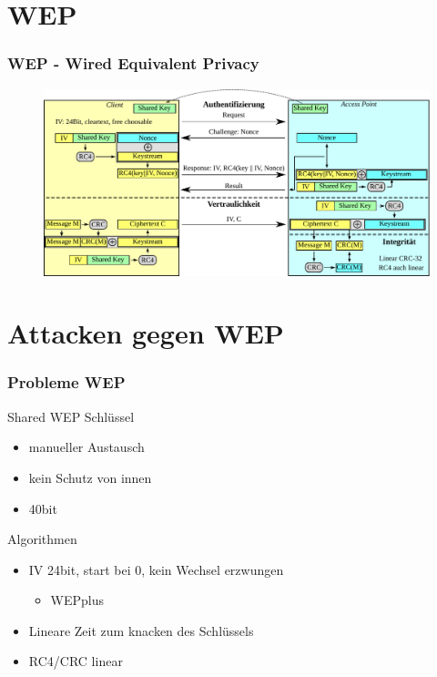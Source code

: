 \documentclass{beamer}
\begin{document}
\section{WEP}
\begin{frame}
\frametitle{WEP - Wired Equivalent Privacy}
\begin{figure}
	\includegraphics[width=1.0\linewidth]{figures/WEP_complete.pdf}
\end{figure}
\end{frame}


\section{Attacken gegen WEP}
\begin{frame}
\frametitle{Probleme WEP}
\begin{block}{Shared WEP Schlüssel}
\begin{itemize}
	\item manueller Austausch
	\item kein Schutz von innen
	\item 40bit
\end{itemize}
\end{block}
\begin{block}{Algorithmen}
\begin{itemize}
	\item IV 24bit, start bei 0, kein Wechsel erzwungen
	\begin{itemize}
		\item WEPplus
	\end{itemize}
	\item Lineare Zeit zum knacken des Schlüssels
	\item RC4/CRC linear
\end{itemize}
\end{block}
\end{frame}
\end{document}
